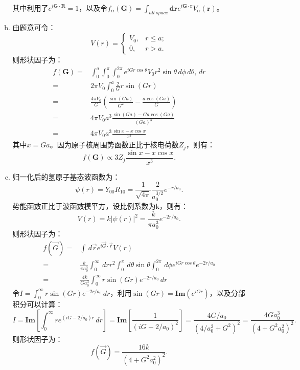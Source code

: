 \documentclass[reqno,a4paper,12pt]{amsart}
\begin{document}
\begin{enumerate}[1.]
\begin{tcolorbox}[breakable, colback = black!5!white, colframe = black]
\begin{enumerate}[(a)]
\begin{align*}
\end{align*}
其中利用了$e^{i\mathbf{G}\cdot\mathbf{R}} = 1$，以及令$f_\alpha(\mathbf{G}) = \int_{all~space} \mathbf{dr} e^{i\mathbf{G}\cdot\mathbf{r}} V_\alpha(\mathbf{r})$。
\item 由题意可令：
\[
	V(r) = \left\{ \begin{array}{ll}
		V_0, & r\leq a; \\
		0, & r>a.
	\end{array} \right.
\]
则形状因子为：
\begin{align*}
	f(\mathbf{G}) =& \int_0^a \int_0^\pi \int_0^{2\pi} e^{iGr\cos\theta} V_0 r^2\sin\theta \,d\phi\,d\theta,\,dr \\
	=& 2\pi V_0 \int_0^a \frac{2}{G}r\sin(Gr) \\
	=& \frac{4\pi V_0}{G} \left( \frac{\sin(Ga)}{G^2} - \frac{a\cos(Ga)}{G} \right) \\
	=& 4\pi V_0 a^3\frac{\sin(Ga) - Ga\cos(Ga)}{(Ga)^3} \\
	=& 4\pi V_0 a^3 \frac{\sin x - x\cos x}{x^3}
\end{align*}
其中$x = Ga$。因为原子核周围势函数正比于核电荷数$Z_j$，则有：
\[
	f(\mathbf{G}) \propto 3Z_j \frac{\sin x - x\cos x}{x^3}.
\]
\item 归一化后的氢原子基态波函数为：
\[
	\psi(r) = Y_{00}R_{10} = \frac{1}{\sqrt{4\pi}}\frac{2}{a_0^{3/2}} e^{-r/a_0}.
\]
势能函数正比于波函数模平方，设比例系数为k，则有：
\[
	V(r) = k\vert \psi(r) \vert^2 = \frac{k}{\pi a_0^3} e^{-2r/a_0}.
\]
则形状因子为：
\begin{align*}
	f(\vec{G}) =& \int \,d\vec{r} e^{i\vec{G} \cdot \vec{r}} V(r) \\
	=& \frac{k}{\pi a_0^3} \int_0^\infty \,dr r^2 \int_0^\pi \,d\theta \sin\theta \int_0^{2\pi} \,d\phi e^{iGr\cos\theta} e^{-2r/a_0} \\
	=& \frac{4k}{Ga_0^3} \int_0^{\infty} r\sin(Gr) e^{-2r/a_0} \,dr
\end{align*}
令$I = \int_0^{\infty} r\sin(Gr) e^{-2r/a_0} \,dr$，利用$\sin(Gr) = \mathbf{Im}(e^{iGr})$，以及分部积分可以计算：
\[
	I = \mathbf{Im} \left[ \int_0^\infty re^{(iG-2/a_0)r} \,dr \right]	= \mathbf{Im} \left[ \frac{1}{(iG-2/a_0)^2} \right] = \frac{4G/a_0}{(4/a_0^2 + G^2)^2} = \frac{4Ga_0^3}{(4+G^2a_0^2)^2}.
\]
则形状因子为：
\[
	f(\vec{G}) = \frac{16k}{(4+G^2a_0^2)^2}.
\]


\end{enumerate}
\end{tcolorbox}
\end{enumerate}
\end{document}
